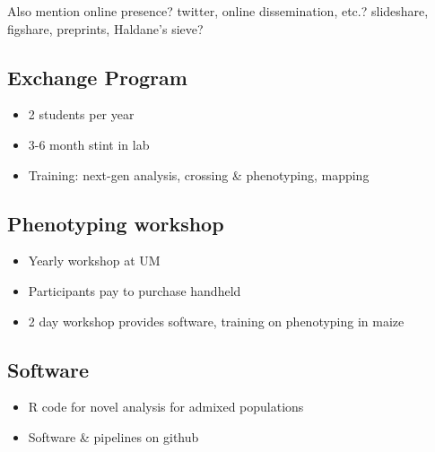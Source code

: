 



\setcounter{section}{1}

Also mention online presence?  twitter, online dissemination, etc.? slideshare, figshare, preprints, Haldane's sieve?

\subsection{Exchange Program} %
\begin{itemize}
\item 2 students per year
\item 3-6 month stint in lab
\item Training: next-gen analysis, crossing \& phenotyping, mapping
\end{itemize}

\subsection{Phenotyping workshop} %
\begin{itemize}
\item Yearly workshop at UM
\item Participants pay to purchase handheld
\item 2 day workshop provides software, training on phenotyping in maize
\end{itemize}

\subsection{Software} %
\begin{itemize}
\item R code for novel analysis for admixed populations
\item Software \& pipelines on github
\end{itemize}

